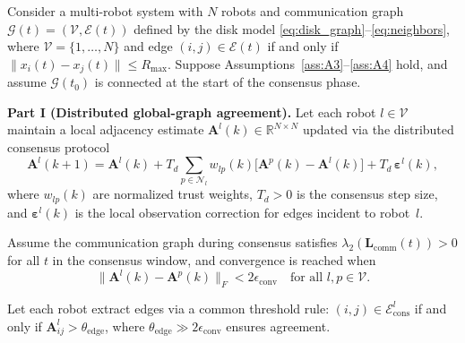 
\begin{theorem}
\label{thm:distributed-connectivity}
Consider a multi-robot system with $N$ robots and communication graph $\mathcal{G}(t)=(\mathcal{V},\mathcal{E}(t))$ defined by the disk model \eqref{eq:disk_graph}--\eqref{eq:neighbors}, where $\mathcal{V}=\{1,\ldots,N\}$ and edge $(i,j)\in\mathcal{E}(t)$ if and only if $\|x_i(t)-x_j(t)\|\le R_{\max}$.
Suppose Assumptions~\ref{ass:A3}--\ref{ass:A4} hold, and assume $\mathcal{G}(t_0)$ is connected at the start of the consensus phase.

\medskip
\noindent\textbf{Part I (Distributed global-graph agreement).}
Let each robot $l\in\mathcal{V}$ maintain a local adjacency estimate $\mathbf{A}^l(k)\in\mathbb{R}^{N\times N}$ updated via the distributed consensus protocol
\begin{equation}
\mathbf{A}^l(k+1) = \mathbf{A}^l(k) + T_d\sum_{p\in\mathcal{N}_l} w_{lp}(k)\bigl[\mathbf{A}^p(k)-\mathbf{A}^l(k)\bigr] + T_d\,\boldsymbol{\varepsilon}^l(k),
\label{eq:consensus-update-thm}
\end{equation}
where $w_{lp}(k)$ are normalized trust weights, $T_d>0$ is the consensus step size, and $\boldsymbol{\varepsilon}^l(k)$ is the local observation correction for edges incident to robot~$l$.

Assume the communication graph during consensus satisfies $\lambda_2(\mathbf{L}_{\mathrm{comm}}(t))>0$ for all $t$ in the consensus window, and convergence is reached when
\begin{equation}
\|\mathbf{A}^l(k)-\mathbf{A}^p(k)\|_F < 2\epsilon_{\mathrm{conv}} \quad\text{for all }l,p\in\mathcal{V}.
\label{eq:consensus-convergence-thm}
\end{equation}

Let each robot extract edges via a common threshold rule: $(i,j)\in\mathcal{E}^l_{\mathrm{cons}}$ if and only if $\mathbf{A}^l_{ij}>\theta_{\mathrm{edge}}$, where $\theta_{\mathrm{edge}}\gg 2\epsilon_{\mathrm{conv}}$ ensures agreement.


\end{theorem}
